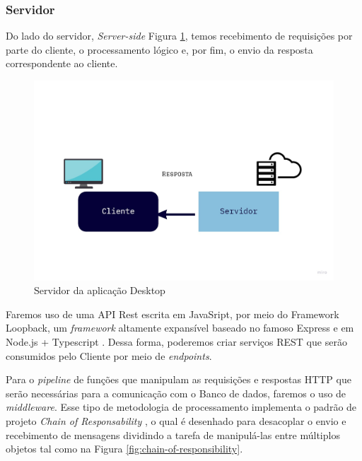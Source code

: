 \subsubsection{Servidor}

\par Do lado do servidor, \textit{Server-side} Figura \ref{fig:Server-side}, temos recebimento de requisições por parte do cliente, o processamento lógico e, por fim, o envio da resposta correspondente ao cliente. 

\begin{figure}[H]
	\centering
		\includegraphics[keepaspectratio=true,scale=0.26]{figuras/server.jpg}
	\caption{Servidor da aplicação Desktop}
	\label{fig:Server-side}
\end{figure}

\par Faremos uso de uma API Rest escrita em JavaSript, por meio do Framework Loopback, um \textit{framework} altamente expansível baseado no famoso Express e em Node.js + Typescript \cite{Loopback}. Dessa forma, poderemos criar serviços REST que serão consumidos pelo Cliente por meio de \textit{endpoints}.

\par Para o \textit{pipeline} de funções que manipulam as requisições e respostas HTTP que serão necessárias para a comunicação com o Banco de dados, faremos o uso de \textit{middleware}. Esse tipo de metodologia de processamento implementa o padrão de projeto \textit{Chain of Responsability}  \cite{Chain}, o qual é desenhado para desacoplar o envio e recebimento de mensagens dividindo a tarefa de manipulá-las entre múltiplos objetos tal como na Figura \ref{fig:chain-of-responsibility}.

